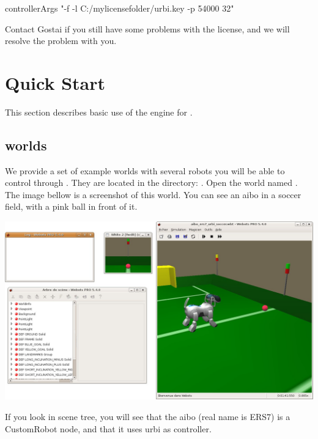 \begin{shell}
controllerArgs "-f -l C:/mylicensefolder/urbi.key  -p 54000 32"
\end{shell}

Contact Gostai if you still have some problems with the license, and
we will resolve the problem with you.

\section{Quick Start}

This section describes basic use of the \urbi engine for \webots.

\subsection{\urbi worlds}

We provide a set of example worlds with several robots you will be
able to control through \urbi. They are located in the directory:
.  Open the
world named . The image bellow is a
screenshot of this world. You can see an aibo in a soccer field, with
a pink ball in front of it.


\begin{center}
  \includegraphics[width=\linewidth]{img/webots/aibo-soccer}
\end{center}

If you look in \webots scene tree, you will see that the aibo (real
name is ERS7) is a CustomRobot node, and that it uses urbi as
controller.

